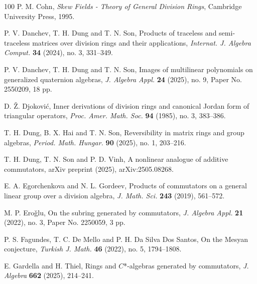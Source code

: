 \documentclass[11pt]{article}
\theoremstyle{definition}
\begin{document}
{{{{\begin{thebibliography}{100}
					P. M. Cohn, \textit{Skew Fields - Theory of General Division Rings}, Cambridge University Press, 1995.
					
					
					
					 P. V. Danchev, T. H. Dung and T. N. Son,
					Products of traceless and semi-traceless matrices over division rings and their applications,
					\textit{Internat. J. Algebra Comput.} \textbf{34} (2024), no. 3, 331--349.
					
					 P. V. Danchev, T. H. Dung and T. N. Son, Images of multilinear polynomials on generalized quaternion algebras,
					\textit{J. Algebra Appl.} \textbf{24} (2025), no. 9, Paper No. 2550209, 18 pp.
					
					 D. {\v{Z}}. Djokovi{\'c}, Inner derivations of division rings and canonical Jordan form of triangular operators, \textit{Proc. Amer. Math. Soc.} \textbf{94} (1985), no. 3, 383--386.
					
					 T. H. Dung, B. X. Hai and T. N. Son, Reversibility in matrix rings and group algebras,
					\textit{Period. Math. Hungar.} \textbf{90} (2025), no. 1, 203--216.
					
					 T. H. Dung, T. N. Son and P. D. Vinh, A nonlinear analogue of additive commutators, arXiv preprint (2025), arXiv:2505.08268.
					
				
					
					
					
					
					 	E. A. Egorchenkova and N. L. Gordeev, Products of commutators on a general linear group over a division algebra, \emph{J. Math. Sci.} \textbf{243} (2019), 561--572.
					
					 M. P. Ero\v{g}lu, On the subring generated by commutators, \textit{J. Algebra Appl.} \textbf{21} (2022), no. 3, Paper No. 2250059, 3 pp.
					
					
					
					 P. S. Fagundes, T. C. De Mello and P. H. Da Silva Dos Santos, On the Mesyan conjecture, \textit{Turkish J. Math.} \textbf{46} (2022), no. 5, 1794--1808.
					
					
					
					 E. Gardella and H. Thiel,
					Rings and $C$*-algebras generated by commutators,
					\textit{J. Algebra} \textbf{662} (2025), 214--241.
					

\end{thebibliography}}}}}
\end{document}
